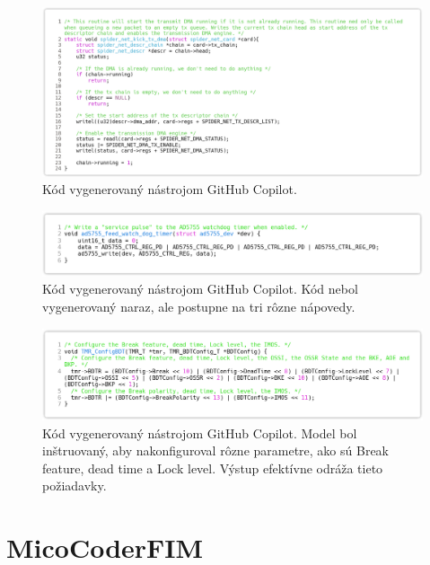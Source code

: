 \begin{figure}[H]
    \centering
    \includegraphics[width=1\textwidth]{obrazky/gpt1.png}
    \caption{Kód vygenerovaný nástrojom GitHub Copilot.}
    \label{fig:gpt1}
\end{figure}

\begin{figure}[H]
    \centering
    \includegraphics[width=1\textwidth]{obrazky/gpt2.png}
    \caption{Kód vygenerovaný nástrojom GitHub Copilot. Kód nebol vygenerovaný naraz, ale postupne na tri rôzne nápovedy.}
    \label{fig:gpt2}
\end{figure}

\begin{figure}[H]
    \centering
    \includegraphics[width=1\textwidth]{obrazky/gpt3.png}
    \caption{Kód vygenerovaný nástrojom GitHub Copilot. Model bol inštruovaný, aby nakonfiguroval rôzne parametre, ako sú Break feature, dead time a Lock level. Výstup efektívne odráža tieto požiadavky.}
    \label{fig:gpt3}
\end{figure}


\section{MicoCoderFIM}

